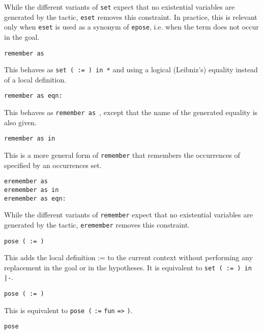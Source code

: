 \begin{coq_example*}
\begin{Variants}
  While the different variants of \texttt{set} expect that no
  existential variables are generated by the tactic, \texttt{eset}
  removes this constraint. In practice, this is relevant only when
  \texttt{eset} is used as a synonym of \texttt{epose}, i.e. when the
  term does not occur in the goal.

\item {\tt remember {\term} as {\ident}}

  This behaves as {\tt set ( {\ident} := {\term} ) in *} and using a
  logical (Leibniz's) equality instead of a local definition.

\item {\tt remember {\term} as {\ident} eqn:{\ident}}

  This behaves as {\tt remember {\term} as {\ident}}, except
  that the name of the generated equality is also given.

\item {\tt remember {\term} as {\ident} in {\occgoalset}}

  This is a more general form of {\tt remember} that remembers the
  occurrences of {\term} specified by an occurrences set.

\item
  {\tt eremember {\term} as {\ident}}\\
  {\tt eremember {\term} as {\ident} in {\occgoalset}}\\
  {\tt eremember {\term} as {\ident} eqn:{\ident}}

  While the different variants of \texttt{remember} expect that no
  existential variables are generated by the tactic, \texttt{eremember}
  removes this constraint.

\item {\tt pose ( {\ident} := {\term} )}

  This adds the local definition {\ident} := {\term} to the current
  context without performing any replacement in the goal or in the
  hypotheses. It is equivalent to {\tt set ( {\ident} {\tt :=}
  {\term} {\tt ) in |-}}.

\item {\tt pose ( {\ident} \nelistnosep{\binder} := {\term} )}

  This is equivalent to {\tt pose (} {\ident} {\tt :=} {\tt fun}
  \nelistnosep{\binder} {\tt =>} {\term} {\tt )}.

\item{\tt pose {\term}}


\end{Variants}
\end{coq_example*}
